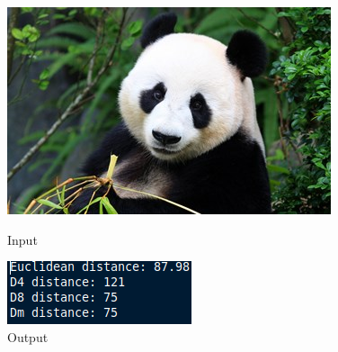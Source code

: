 \documentclass[a4paper,8pt]{article}
\begin{document}
        \begin{figure}[H]
        \centering
        \begin{minipage}{0.4\linewidth}
        \centering
        \includegraphics[width=\linewidth]{output/input1.jpg}
        \caption{Input}
        \end{minipage}
        \hfill
        \begin{minipage}{0.4\linewidth}
        \centering
        \includegraphics[width=\linewidth]{output/Pixel Distance_output.png}
        \caption{Output}
        \end{minipage}
        \end{figure}
        \clearpage
        
\end{document}
